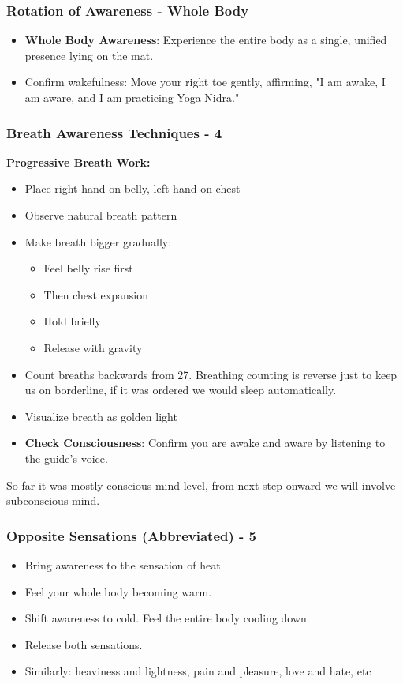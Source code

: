 \begin{frame}[fragile]\frametitle{Rotation of Awareness - Whole Body}
    \begin{itemize}
        \item \textbf{Whole Body Awareness}: Experience the entire body as a single, unified presence lying on the mat.
        \item Confirm wakefulness: Move your right toe gently, affirming, "I am awake, I am aware, and I am practicing Yoga Nidra."
    \end{itemize}
\end{frame}


\begin{frame}[fragile]\frametitle{Breath Awareness Techniques - 4}
    \textbf{Progressive Breath Work:}
    \begin{itemize}
        \item Place right hand on belly, left hand on chest
        \item Observe natural breath pattern
        \item Make breath bigger gradually:
        \begin{itemize}
            \item Feel belly rise first
            \item Then chest expansion
            \item Hold briefly
            \item Release with gravity
        \end{itemize}
        \item Count breaths backwards from 27. Breathing counting is reverse just to keep us on borderline, if it was ordered we would sleep automatically.
        \item Visualize breath as golden light
		\item \textbf{Check Consciousness}: Confirm you are awake and aware by listening to the guide’s voice.
    \end{itemize}
	
So far it was mostly conscious mind level, from next step onward we will involve subconscious mind.	
\end{frame}

\begin{frame}[fragile]\frametitle{Opposite Sensations (Abbreviated) - 5}
    \begin{itemize}
        \item Bring awareness to the sensation of heat
        \item Feel your whole body becoming warm.
        \item Shift awareness to cold. Feel the entire body cooling down.
        \item Release both sensations.
		\item Similarly: heaviness and lightness, pain and pleasure, love and hate, etc
    \end{itemize}
\end{frame}

